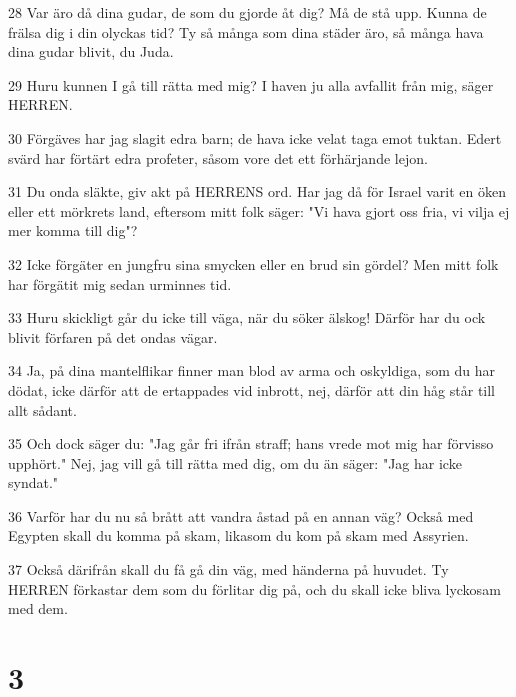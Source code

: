 \par 28 Var äro då dina gudar, de som du gjorde åt dig? Må de stå upp. Kunna de frälsa dig i din olyckas tid? Ty så många som dina städer äro, så många hava dina gudar blivit, du Juda.
\par 29 Huru kunnen I gå till rätta med mig? I haven ju alla avfallit från mig, säger HERREN.
\par 30 Förgäves har jag slagit edra barn; de hava icke velat taga emot tuktan. Edert svärd har förtärt edra profeter, såsom vore det ett förhärjande lejon.
\par 31 Du onda släkte, giv akt på HERRENS ord. Har jag då för Israel varit en öken eller ett mörkrets land, eftersom mitt folk säger: "Vi hava gjort oss fria, vi vilja ej mer komma till dig"?
\par 32 Icke förgäter en jungfru sina smycken eller en brud sin gördel? Men mitt folk har förgätit mig sedan urminnes tid.
\par 33 Huru skickligt går du icke till väga, när du söker älskog! Därför har du ock blivit förfaren på det ondas vägar.
\par 34 Ja, på dina mantelflikar finner man blod av arma och oskyldiga, som du har dödat, icke därför att de ertappades vid inbrott, nej, därför att din håg står till allt sådant.
\par 35 Och dock säger du: "Jag går fri ifrån straff; hans vrede mot mig har förvisso upphört." Nej, jag vill gå till rätta med dig, om du än säger: "Jag har icke syndat."
\par 36 Varför har du nu så brått att vandra åstad på en annan väg? Också med Egypten skall du komma på skam, likasom du kom på skam med Assyrien.
\par 37 Också därifrån skall du få gå din väg, med händerna på huvudet. Ty HERREN förkastar dem som du förlitar dig på, och du skall icke bliva lyckosam med dem.

\chapter{3}

